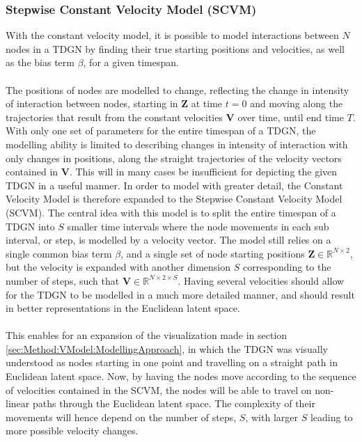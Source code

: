 \subsubsection{Stepwise Constant Velocity Model (SCVM)}
\label{sec:Method:ProposedModel:PiecewiseConstantVelocityModel}

With the constant velocity model, it is possible to model interactions between $N$ nodes in a TDGN by finding their true starting positions and velocities, as well as the bias term $\beta$, for a given timespan.
\\\\
The positions of nodes are modelled to change, reflecting the change in intensity of interaction between nodes, starting in $\textbf{Z}$ at time $t=0$ and moving along the trajectories that result from the constant velocities $\textbf{V}$ over time, until end time $T$.
With only one set of parameters for the entire timespan of a TDGN, the modelling ability is limited to describing changes in intensity of interaction with only changes in positions, along the straight trajectories of the velocity vectors contained in $\textbf{V}$.
This will in many cases be insufficient for depicting the given TDGN in a useful manner. 
In order to model with greater detail, the Constant Velocity Model is therefore expanded to the Stepwise Constant Velocity Model (SCVM). 
The central idea with this model is to split the entire timespan of a TDGN into $S$ smaller time intervals where the node movements in each sub interval, or step, is modelled by a velocity vector. The model still relies on a single common bias term $\beta$, and a single set of node starting positions $\textbf{Z} \in \mathbb{R}^{N \times 2}$, but the velocity is expanded with another dimension $S$ corresponding to the number of steps, such that $\textbf{V} \in \mathbb{R}^{N \times 2 \times S}$.
Having several velocities should allow for the TDGN to be modelled in a much more detailed manner, and should result in better representations in the Euclidean latent space.
\\\\
This enables for an expansion of the visualization made in section \ref{sec:Method:VModel:ModellingApproach}, in which the TDGN was visually understood as nodes starting in one point and travelling on a straight path in Euclidean latent space.
Now, by having the nodes move according to the sequence of velocities contained in the SCVM, the nodes will be able to travel on non-linear paths through the Euclidean latent space.
The complexity of their movements will hence depend on the number of steps, $S$, with larger $S$ leading to more possible velocity changes.

